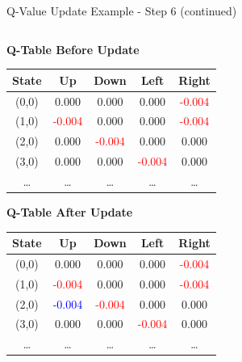 \documentclass[aspectratio=169]{beamer}
\begin{document}
\begin{frame}{Q-Value Update Example - Step 6 (continued)}

    \begin{columns}
        \begin{column}{0.5\textwidth}
            \textbf{Q-Table Before Update}
            \small
            \begin{table}[h]
                \centering
                \begin{tabular}{|c|c|c|c|c|}
                    \hline
                    \textbf{State} & \textbf{Up} & \textbf{Down} & \textbf{Left} & \textbf{Right} \\
                    \hline
                    (0,0) & 0.000 & 0.000 & 0.000 & \textcolor{red}{-0.004} \\
                    (1,0) & \textcolor{red}{-0.004} & 0.000 & 0.000 & \textcolor{red}{-0.004} \\
                    (2,0) & 0.000 & \textcolor{red}{-0.004} & 0.000 & 0.000 \\
                    (3,0) & 0.000 & 0.000 & \textcolor{red}{-0.004} & 0.000 \\
                    \dots & \dots & \dots & \dots & \dots \\
                    \hline
                \end{tabular}
            \end{table}
            
            \textbf{Q-Table After Update}
            \small
            \begin{table}[h]
                \centering
                \begin{tabular}{|c|c|c|c|c|}
                    \hline
                    \textbf{State} & \textbf{Up} & \textbf{Down} & \textbf{Left} & \textbf{Right} \\
                    \hline
                    (0,0) & 0.000 & 0.000 & 0.000 & \textcolor{red}{-0.004} \\
                    (1,0) & \textcolor{red}{-0.004} & 0.000 & 0.000 & \textcolor{red}{-0.004} \\
                    (2,0) & \textcolor{blue}{-0.004} & \textcolor{red}{-0.004} & 0.000 & 0.000 \\
                    (3,0) & 0.000 & 0.000 & \textcolor{red}{-0.004} & 0.000 \\
                    \dots & \dots & \dots & \dots & \dots \\
                    \hline
                \end{tabular}
            \end{table}
        \end{column}
        

\end{columns}
\end{frame}
\end{document}
